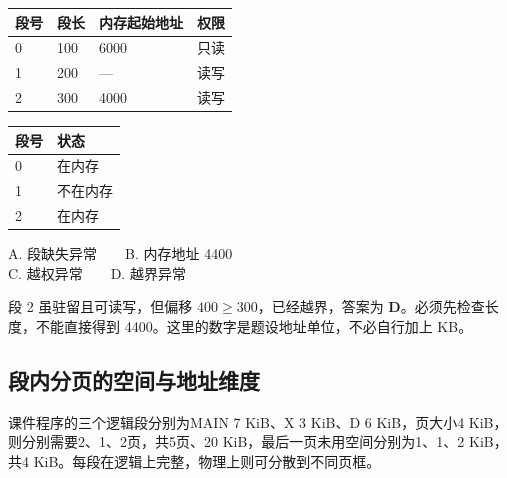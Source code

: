 \begin{wideblock}

\par\medskip\noindent\begin{minipage}{\linewidth}\fontsize{9.3}{12}\selectfont\begin{tabularx}{\linewidth}{@{}YYYY@{}}
\toprule\noalign{}
段号 & 段长 & 内存起始地址 & 权限 \\
\midrule\noalign{}


0 & 100 & 6000 & 只读 \\
1 & 200 & --- & 读写 \\
2 & 300 & 4000 & 读写 \\
\bottomrule\end{tabularx}
\end{minipage}\par\medskip

\end{wideblock}

\begin{wideblock}

\par\medskip\noindent\begin{minipage}{\linewidth}\fontsize{9.3}{12}\selectfont\begin{tabularx}{\linewidth}{@{}YY@{}}
\toprule\noalign{}
段号 & 状态 \\
\midrule\noalign{}


0 & 在内存 \\
1 & 不在内存 \\
2 & 在内存 \\
\bottomrule\end{tabularx}
\end{minipage}\par\medskip

\end{wideblock}

A. 段缺失异常　　B. 内存地址 4400\\
C. 越权异常　　D. 越界异常

段 2 虽驻留且可读写，但偏移 \(400\ge300\)，已经越界，答案为 \textbf{D}。必须先检查长度，不能直接得到 4400。这里的数字是题设地址单位，不必自行加上 KB。

\subsection{段内分页的空间与地址维度}\label{OS03-segment-pages}

课件程序的三个逻辑段分别为MAIN 7 KiB、X 3 KiB、D 6 KiB，页大小4 KiB，则分别需要2、1、2页，共5页、20 KiB，最后一页未用空间分别为1、1、2 KiB，共4 KiB。每段在逻辑上完整，物理上则可分散到不同页框。

